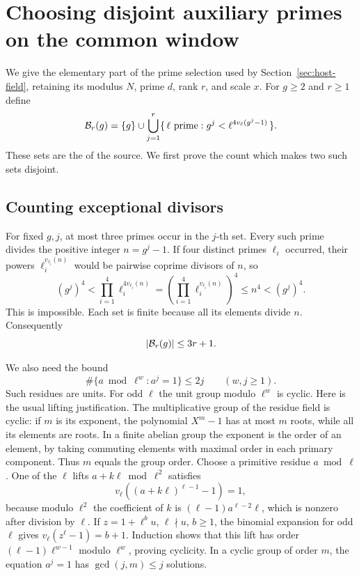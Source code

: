 \section{Choosing disjoint auxiliary primes on the common window}
\label{sec:level-prime-selection}

We give the elementary part of the prime selection used by
Section~\ref{sec:host-field}, retaining its modulus \(N\), prime \(d\),
rank \(r\), and scale \(x\).
For \(g\geq2\) and \(r\geq1\) define
\[
 {\cal B}_r(g)=\{g\}\cup
 \bigcup_{j=1}^{r}
 \{\,\ell\text{ prime}:g^j<\ell^{4v_\ell(g^j-1)}\,\}.
\]
These sets are the  of the source. We first prove the
count which makes two such sets disjoint.

\subsection{Counting exceptional divisors}

For fixed \(g,j\), at most three primes occur in the \(j\)-th set.
Every such prime divides the positive integer \(n=g^j-1\).
If four distinct primes \(\ell_i\) occurred, their powers
\(\ell_i^{v_{\ell_i}(n)}\) would be pairwise coprime divisors of \(n\),
so
\[
 (g^j)^4<
 \prod_{i=1}^{4}\ell_i^{4v_{\ell_i}(n)}
 =\left(\prod_{i=1}^{4}\ell_i^{v_{\ell_i}(n)}\right)^4
 \leq n^4<(g^j)^4 .
\]
This is impossible. Each set is finite because all its elements
divide \(n\). Consequently
\begin{equation}
 \label{eq:level-bb-card}
       |{\cal B}_r(g)|\leq3r+1 .
\end{equation}

We also need the bound
\begin{equation}
 \label{eq:level-roots}
 \#\{a\bmod\ell^w:a^j=1\}\leq2j
       \qquad(w,j\geq1).
\end{equation}
Such residues are units. For odd \(\ell\) the unit group modulo
\(\ell^w\) is cyclic. Here is the usual lifting justification.
The multiplicative group of the residue field is cyclic: if \(m\)
is its exponent, the polynomial \(X^m-1\) has at most \(m\) roots,
while all its elements are roots. In a finite abelian group the
exponent is the order of an element, by taking commuting elements
with maximal order in each primary component. Thus \(m\) equals
the group order. Choose a primitive residue \(a\bmod\ell\).
One of the \(\ell\) lifts \(a+k\ell\bmod\ell^2\) satisfies
\[
          v_\ell((a+k\ell)^{\ell-1}-1)=1 ,
\]
because modulo \(\ell^2\) the coefficient of \(k\) is
\((\ell-1)a^{\ell-2}\ell\), which is nonzero after division by
\(\ell\). If \(z=1+\ell^b u\), \(\ell\nmid u\), \(b\geq1\),
the binomial expansion for odd \(\ell\) gives
\(v_\ell(z^\ell-1)=b+1\). Induction shows that this lift has order
\((\ell-1)\ell^{w-1}\) modulo \(\ell^w\), proving cyclicity.
In a cyclic group of order \(m\), the equation \(a^j=1\) has
\(\gcd(j,m)\leq j\) solutions.

